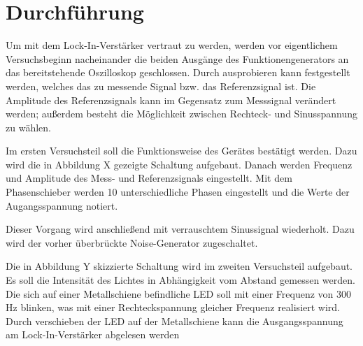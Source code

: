 \section{Durchführung}
\label{sec:Durchfuehrung}
Um mit dem Lock-In-Verstärker vertraut zu werden, werden vor eigentlichem Versuchsbeginn nacheinander die beiden Ausgänge des Funktionengenerators an das bereitstehende Oszilloskop geschlossen. Durch ausprobieren kann festgestellt werden, welches das zu messende Signal bzw. das Referenzsignal ist. Die Amplitude des Referenzsignals kann im Gegensatz zum Messsignal verändert werden; außerdem besteht die Möglichkeit zwischen Rechteck- und Sinusspannung zu wählen.

Im ersten Versuchsteil soll die Funktionsweise des Gerätes bestätigt werden. Dazu wird die in Abbildung X gezeigte Schaltung aufgebaut. Danach werden Frequenz und Amplitude des Mess- und Referenzsignals eingestellt. Mit dem Phasenschieber werden 10 unterschiedliche Phasen eingestellt und die Werte der Augangsspannung notiert.

Dieser Vorgang wird anschließend mit verrauschtem Sinussignal wiederholt. Dazu wird der vorher überbrückte Noise-Generator zugeschaltet.

Die in Abbildung Y skizzierte Schaltung wird im zweiten Versuchsteil aufgebaut. Es soll die Intensität des Lichtes in Abhängigkeit vom Abstand gemessen werden.
Die sich auf einer Metallschiene befindliche LED soll mit einer Frequenz von 300 Hz blinken, was mit einer Rechteckspannung gleicher Frequenz realisiert wird. Durch verschieben der LED auf der Metallschiene kann die Ausgangsspannung am Lock-In-Verstärker abgelesen werden
